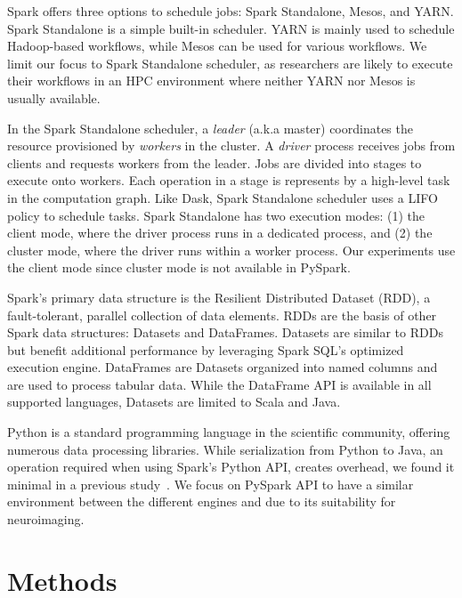 \documentclass[AMA,STIX1COL]{WileyNJD-v2}
\begin{document}
Spark offers three options to schedule jobs: Spark Standalone, Mesos, and YARN.
Spark Standalone is a simple built-in scheduler.
YARN is mainly used to schedule Hadoop-based workflows, while Mesos can be used for various workflows.
We limit our focus to Spark Standalone scheduler, as researchers are likely to 
execute their workflows in an HPC environment where neither YARN nor Mesos is usually available.
		
In the Spark Standalone scheduler, a \textit{leader} (a.k.a master) coordinates the resource provisioned by \textit{workers} in the cluster.
A \textit{driver}  process receives jobs from clients and requests workers from the leader.
Jobs are divided into stages to execute onto workers.
Each operation in a stage is represents by a high-level task in the computation graph.
Like Dask, Spark Standalone scheduler uses a LIFO policy to schedule tasks.
Spark Standalone has two execution modes: (1) the client mode, where the driver process runs in a dedicated process,
and (2) the cluster mode, where the driver runs within a worker process.
Our experiments use the client mode since cluster mode is not available in PySpark.
		
Spark's primary data structure is the Resilient Distributed Dataset (RDD)\cite{RDD}, a fault-tolerant, parallel collection of data elements.
RDDs are the basis of other Spark data structures: Datasets and DataFrames.
Datasets are similar to RDDs but benefit additional performance by leveraging Spark SQL's optimized execution engine. 
DataFrames are Datasets organized into named columns and are used to process tabular data. 
While the DataFrame API is available in all supported languages, Datasets are limited to Scala and Java. 
		
Python is a standard programming language in the scientific community, offering numerous data processing libraries.
While serialization from Python to Java, an operation required when using Spark's Python API, creates overhead, we found it minimal in a previous study~\cite{8943502}.
We focus on PySpark API to have a similar environment between the different engines and due to its suitability for neuroimaging.
		
\section{Methods}
\end{document}
